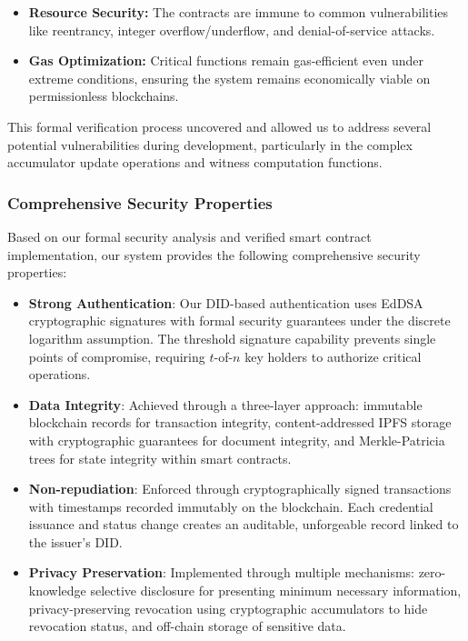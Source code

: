 \documentclass[lettersize,journal]{IEEEtran}
\begin{document}
\begin{itemize}
\begin{itemize}
    \item \textbf{Resource Security:} The contracts are immune to common vulnerabilities like reentrancy, integer overflow/underflow, and denial-of-service attacks.
    
    \item \textbf{Gas Optimization:} Critical functions remain gas-efficient even under extreme conditions, ensuring the system remains economically viable on permissionless blockchains.
\end{itemize}

This formal verification process uncovered and allowed us to address several potential vulnerabilities during development, particularly in the complex accumulator update operations and witness computation functions.

\subsubsection{Comprehensive Security Properties}
Based on our formal security analysis and verified smart contract implementation, our system provides the following comprehensive security properties:

\begin{itemize}
    \item \textbf{Strong Authentication}: Our DID-based authentication uses EdDSA cryptographic signatures with formal security guarantees under the discrete logarithm assumption. The threshold signature capability prevents single points of compromise, requiring $t$-of-$n$ key holders to authorize critical operations.
    
    \item \textbf{Data Integrity}: Achieved through a three-layer approach: immutable blockchain records for transaction integrity, content-addressed IPFS storage with cryptographic guarantees for document integrity, and Merkle-Patricia trees for state integrity within smart contracts.
    
    \item \textbf{Non-repudiation}: Enforced through cryptographically signed transactions with timestamps recorded immutably on the blockchain. Each credential issuance and status change creates an auditable, unforgeable record linked to the issuer's DID.
    
    \item \textbf{Privacy Preservation}: Implemented through multiple mechanisms: zero-knowledge selective disclosure for presenting minimum necessary information, privacy-preserving revocation using cryptographic accumulators to hide revocation status, and off-chain storage of sensitive data.
    

\end{itemize}
\end{itemize}
\end{document}
